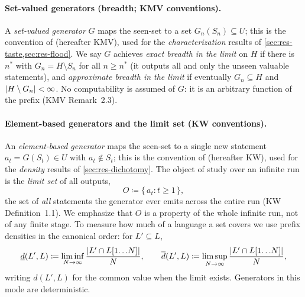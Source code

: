 \documentclass[11pt]{article}
\numberwithin{equation}{section}
\newcommand{\defeq}{\coloneqq}
\DeclarePairedDelimiter{\abs}{\lvert}{\rvert}
\newcommand{\gnd}{U}
\newcommand{\Val}{H}
\newcommand{\Seen}{S}
\newcommand{\Out}{O}
\newcommand{\dlow}[2]{\underline{d}(#1,#2)}
\newcommand{\dup}[2]{\overline{d}(#1,#2)}
\newcommand{\dens}[2]{d(#1,#2)}
\newcommand{\rest}[2]{#1[1\!\dots\! #2]}
\theoremstyle{plain}
\theoremstyle{definition}
\theoremstyle{remark}
\begin{document}
\paragraph{Set-valued generators (breadth; KMV conventions).}
A \emph{set-valued generator} $G$ maps the seen-set to a set $G_n(\Seen_n) \subseteq \gnd$;
this is the convention of \citet{kalavasis2024characterizations} (hereafter KMV), used for the
\emph{characterization} results of \cref{sec:res-taste,sec:res-flood}. We say $G$ achieves
\emph{exact breadth in the limit} on $\Val$ if there is $n^*$ with $G_n = \Val \setminus
\Seen_n$ for all $n \ge n^*$ (it outputs all and only the unseen valuable statements), and
\emph{approximate breadth in the limit} if eventually $G_n \subseteq \Val$ and $\abs{\Val
\setminus G_n} < \infty$. No computability is assumed of $G$: it is an arbitrary function of
the prefix (KMV Remark~2.3).

\paragraph{Element-based generators and the limit set (KW conventions).}
An \emph{element-based generator} maps the seen-set to a single new statement $a_t =
G(\Seen_t) \in \gnd$ with $a_t \notin \Seen_t$; this is the convention of
\citet{kleinberg2026partial} (hereafter KW), used for the \emph{density} results of
\cref{sec:res-dichotomy}. The object of study over an infinite run is the \emph{limit set} of
all outputs,
\begin{equation}\label{eq:limitset}
  \Out \defeq \{\, a_t : t \ge 1 \,\},
\end{equation}
the set of \emph{all} statements the generator ever emits across the entire run (KW
Definition~1.1). We emphasize that $\Out$ is a property of the whole infinite run, not of any
finite stage. To measure how much of a language a set covers we use prefix densities in the
canonical order: for $L' \subseteq L$,
\begin{equation}\label{eq:density}
  \dlow{L'}{L} \defeq \liminf_{N \to \infty} \frac{\abs{L' \cap \rest{L}{N}}}{N},
  \qquad
  \dup{L'}{L} \defeq \limsup_{N \to \infty} \frac{\abs{L' \cap \rest{L}{N}}}{N},
\end{equation}
writing $\dens{L'}{L}$ for the common value when the limit exists. Generators in this mode are
deterministic.
\end{document}
